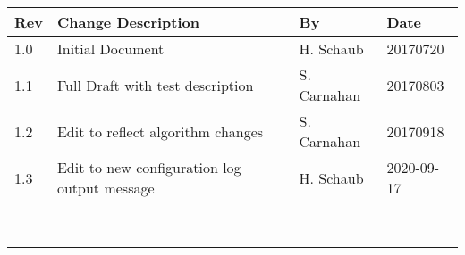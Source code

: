 \documentclass[]{BasiliskReportMemo}
\begin{document}
\makeCover

%
%
\pagestyle{empty}
{\renewcommand{\arraystretch}{2}
\noindent
\begin{longtable}{|p{0.5in}|p{3.5in}|p{1.07in}|p{0.9in}|}
\hline
{\bfseries Rev} & {\bfseries Change Description} & {\bfseries By}& {\bfseries Date} \\
\hline
1.0 & Initial Document &  H. Schaub & 20170720\\
\hline
1.1 & Full Draft with test description & S. Carnahan & 20170803\\
\hline
1.2 & Edit to reflect algorithm changes & S. Carnahan & 20170918\\
\hline

1.3 & Edit to new configuration log output message & H. Schaub & 2020-09-17\\
\hline

\end{longtable}
}



\newpage
\setcounter{page}{1}
\pagestyle{fancy}

\tableofcontents %
~\\ \hrule ~\\ %


\newpage







	









\end{document}
